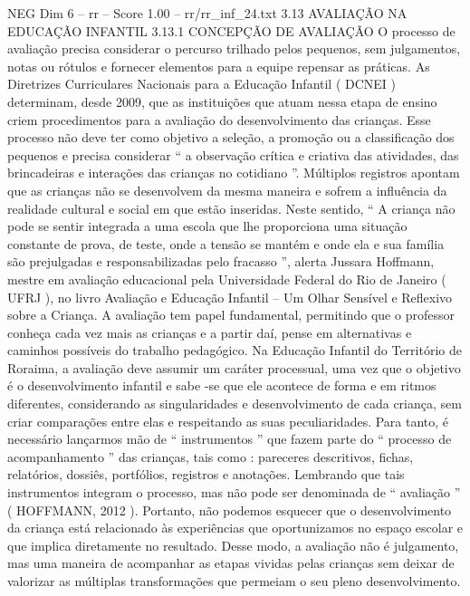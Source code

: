 \begin{textsample}{NEG Dim 6 – rr – Score 1.00 – rr/rr\_inf\_24.txt}  \label{ex:f6_neg_075}
3.13 AVALIAÇÃO NA EDUCAÇÃO INFANTIL 3.13.1 CONCEPÇÃO DE AVALIAÇÃO O processo de avaliação precisa considerar o percurso trilhado pelos pequenos, sem julgamentos, notas ou rótulos e fornecer elementos para a equipe repensar as práticas.
As Diretrizes Curriculares Nacionais para a Educação Infantil ( DCNEI ) determinam, desde 2009, que as instituições que atuam nessa etapa de ensino criem procedimentos para a avaliação do desenvolvimento das crianças.
Esse processo não deve ter como objetivo a seleção, a promoção ou a classificação dos pequenos e precisa considerar “ a observação crítica e criativa das atividades, das brincadeiras e interações das crianças no cotidiano ”.
Múltiplos registros apontam que as crianças não se desenvolvem da mesma maneira e sofrem a influência da realidade cultural e social em que estão inseridas.
Neste sentido, “ A criança não pode se sentir integrada a uma escola que lhe proporciona uma situação constante de prova, de teste, onde a tensão se mantém e onde ela e sua família são prejulgadas e responsabilizadas pelo fracasso ”, alerta Jussara Hoffmann, mestre em avaliação educacional pela Universidade Federal do Rio de Janeiro ( UFRJ ), no livro Avaliação e Educação Infantil – Um Olhar Sensível e Reflexivo sobre a Criança.
A avaliação tem papel fundamental, permitindo que o professor conheça cada vez mais as crianças e a partir daí, pense em alternativas e caminhos possíveis do trabalho pedagógico.
Na Educação Infantil do Território de Roraima, a avaliação deve assumir um caráter processual, uma vez que o objetivo é o desenvolvimento infantil e sabe -se que ele acontece de forma e em ritmos diferentes, considerando as singularidades e desenvolvimento de cada criança, sem criar comparações entre elas e respeitando as suas peculiaridades.
Para tanto, é necessário lançarmos mão de “ instrumentos ” que fazem parte do “ processo de acompanhamento ” das crianças, tais como : pareceres descritivos, fichas, relatórios, dossiês, portfólios, registros e anotações.
Lembrando que tais instrumentos integram o processo, mas não pode ser denominada de “ avaliação ” ( HOFFMANN, 2012 ).
Portanto, não podemos esquecer que o desenvolvimento da criança está relacionado às experiências que oportunizamos no espaço escolar e que implica diretamente no resultado.
Desse modo, a avaliação não é julgamento, mas uma maneira de acompanhar as etapas vividas pelas crianças sem deixar de valorizar as múltiplas transformações que permeiam o seu pleno desenvolvimento.

\end{textsample}

